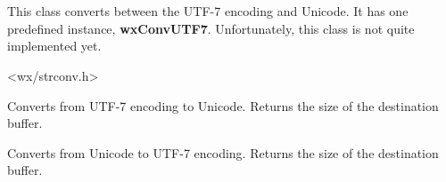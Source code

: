 %
%


\section{}\label{wxmbconvutf7}

This class converts between the UTF-7 encoding and Unicode.
It has one predefined instance, {\bf wxConvUTF7}.
Unfortunately, this class is not quite implemented yet.




<wx/strconv.h>





\label{wxmbconvutf7mb2wc}


Converts from UTF-7 encoding to Unicode. Returns the size of the destination buffer.

\label{wxmbconvutf7wc2mb}


Converts from Unicode to UTF-7 encoding. Returns the size of the destination buffer.
